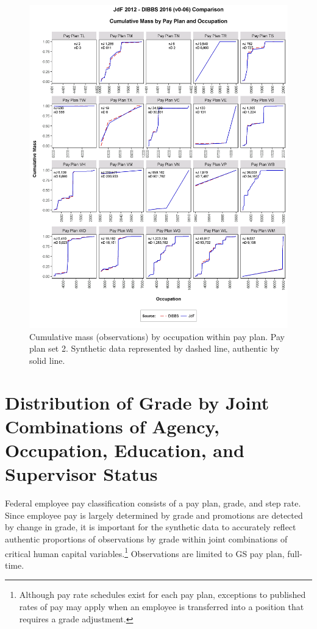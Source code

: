 \documentclass[10pt, letterpaper]{article}
\begin{document}
\begin{spacing}{1.0}
\begin{figure}[]
    \centering
    \includegraphics[width=6.25in, trim={0 1in 0 0.75in}, clip]{CMFOccupationPayPlan141.png}
    \caption{Cumulative mass (observations) by occupation within pay plan.  Pay plan set 2. Synthetic data represented by dashed line, authentic by solid line.}
    \label{figure:CMFOccupationPayPlan2}
\end{figure}

\clearpage

\section{Distribution of Grade by Joint Combinations of Agency, Occupation, Education, and Supervisor Status}

Federal employee pay classification consists of a pay plan, grade, and step rate.  Since employee pay is largely determined by grade and promotions are detected by change in grade, it is important for the synthetic data to accurately reflect authentic proportions of observations by grade within joint combinations of critical human capital variables.\footnote{Although pay rate schedules exist for each pay plan, exceptions to published rates of pay may apply when an employee is transferred into a position that requires a grade adjustment.}  Observations are limited to GS pay plan, full-time.


\end{spacing}
\end{document}
